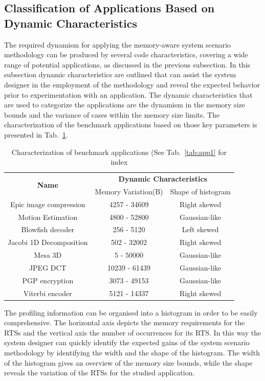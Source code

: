 \subsection{Classification of Applications Based on Dynamic Characteristics}
\label{sec:categorisationC}
The required dynamism for applying the memory-aware system scenario methodology can be produced by several code characteristics, covering a wide range of potential applications, as discussed in the previous subsection. 
In this subsection dynamic characteristics are outlined that can assist the system designer in the employment of the methodology and reveal the expected behavior prior to experimentation with an application. 
The dynamic characteristics that are used to categorize the applications are the dynamism in the memory size bounds and the variance of cases within the memory size limits.
The characterization of the benchmark applications based on those key parameters is presented in Tab.~\ref{tab:app2}.

\begin{table}
\caption{Characterization of benchmark applications (See Tab.~\ref{tab:app1} for index}
\label{tab:app2}
{
\begin{tabular}{|c|c|c|}
\hline
\multirow{2}{*}{\textbf{Name}} & \multicolumn{2}{c|}{\textbf{Dynamic Characteristics}} \\ \cline{2-3}
 & Memory Variation(B) & Shape of histogram\\ 
\hline 
Epic image compression & 4257 - 34609  & Right skewed \\ 
\hline 
Motion Estimation & 4800 - 52800  & Gaussian-like \\ 
\hline 
Blowfish decoder & 256 - 5120 & Left skewed \\ 
\hline 
Jacobi 1D Decomposition & 502 - 32002 & Right skewed \\ 
\hline 
Mesa 3D & 5 - 50000 & Gaussian-like\\ 
\hline 
JPEG DCT & 10239 - 61439 & Gaussian-like \\ 
\hline 
PGP encryption & 3073 - 49153 & Gaussian-like \\ 
\hline 
Viterbi encoder & 5121 - 14337 & Right skewed \\ 
\hline 
\end{tabular}}
\end{table}

The profiling information can be organised into a histogram in order to be easily comprehensive. 
The horizontal axis depicts the memory requirements for the RTSs and the vertical axis the number of occurrences for its RTS. 
In this way the system designer can quickly identify the expected gains of the system scenario methodology by identifying the width and the shape of the histogram. 
The width of the histogram gives an overview of the memory size bounds, while the shape reveals the variation of the RTSs for the studied application.


